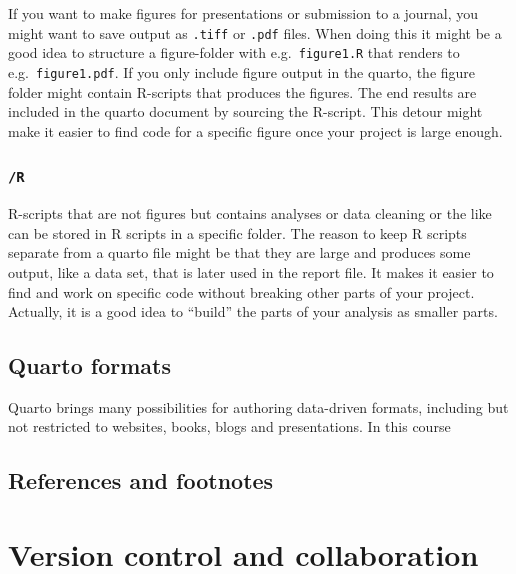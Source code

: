 \documentclass[
  11pt,
  letterpaper,
]{scrbook}
\begin{document}
If you want to make figures for presentations or submission to a
journal, you might want to save output as \texttt{.tiff} or
\texttt{.pdf} files. When doing this it might be a good idea to
structure a figure-folder with e.g.~\texttt{figure1.R} that renders to
e.g.~\texttt{figure1.pdf}. If you only include figure output in the
quarto, the figure folder might contain R-scripts that produces the
figures. The end results are included in the quarto document by sourcing
the R-script. This detour might make it easier to find code for a
specific figure once your project is large enough.

\hypertarget{r}{%
\subsection{\texorpdfstring{\texttt{/R}}{/R}}\label{r}}

R-scripts that are not figures but contains analyses or data cleaning or
the like can be stored in R scripts in a specific folder. The reason to
keep R scripts separate from a quarto file might be that they are large
and produces some output, like a data set, that is later used in the
report file. It makes it easier to find and work on specific code
without breaking other parts of your project. Actually, it is a good
idea to ``build'' the parts of your analysis as smaller parts.

\hypertarget{quarto-formats}{%
\section{Quarto formats}\label{quarto-formats}}

Quarto brings many possibilities for authoring data-driven formats,
including but not restricted to websites, books, blogs and
presentations. In this course

\hypertarget{references-and-footnotes-5}{%
\section{References and footnotes}\label{references-and-footnotes-5}}


\hypertarget{version-control-and-collaboration}{%
\chapter{Version control and
collaboration}\label{version-control-and-collaboration}}
\end{document}
